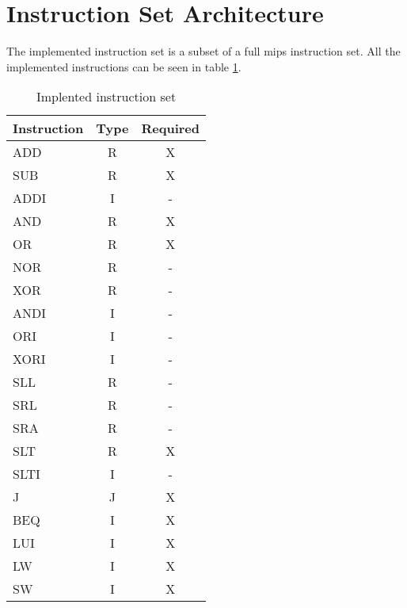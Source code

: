 \section{Instruction Set Architecture}
The implemented instruction set is a subset of a full \gls{mips} instruction set.
All the implemented instructions can be seen in table \ref{table:instruction-types}.

\begin{table}[h]
  \centering
    \begin{tabular}{l|c|c}
    Instruction & Type & Required \\ \hline
    ADD         & R    & X        \\
    SUB         & R    & X        \\
    ADDI        & I    & -        \\
    AND         & R    & X        \\
    OR          & R    & X        \\
    NOR         & R    & -        \\
    XOR         & R    & -        \\
    ANDI        & I    & -        \\
    ORI         & I    & -        \\
    XORI        & I    & -        \\
    SLL         & R    & -        \\
    SRL         & R    & -        \\
    SRA         & R    & -        \\
    SLT         & R    & X        \\
    SLTI        & I    & -        \\
    J           & J    & X        \\
    BEQ         & I    & X        \\
    LUI         & I    & X        \\
    LW          & I    & X        \\
    SW          & I    & X        \\
    \end{tabular}
    \caption {Implented instruction set}
    \label{table:instruction-types}
\end{table}


